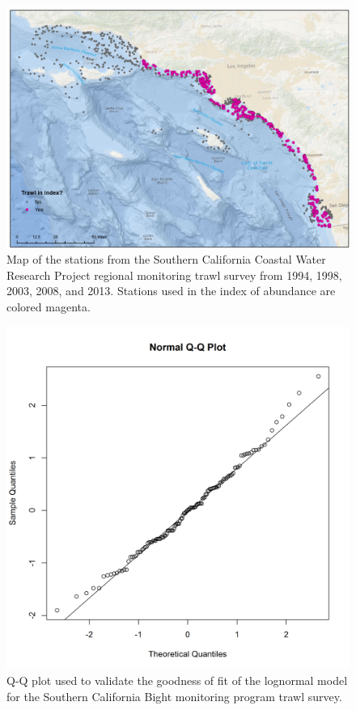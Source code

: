 \documentclass[12pt,]{article}
\begin{document}
\FloatBarrier

\begin{figure}[htbp]
\centering
\includegraphics{Figures/Fleet11_SCBSurvey_map.pdf}
\caption{Map of the stations from the Southern California Coastal Water
Research Project regional monitoring trawl survey from 1994, 1998, 2003,
2008, and 2013. Stations used in the index of abundance are colored
magenta. \label{Fleet11_SCBSurvey_map}}
\end{figure}

\begin{figure}[htbp]
\centering
\includegraphics{Figures/Fleet11_SCBsurvey_QQ.png}
\caption{Q-Q plot used to validate the goodness of fit of the lognormal
model for the Southern California Bight monitoring program trawl survey.
\label{fig:Fleet11_SCBsurvey_QQ}}
\end{figure}
\end{document}
